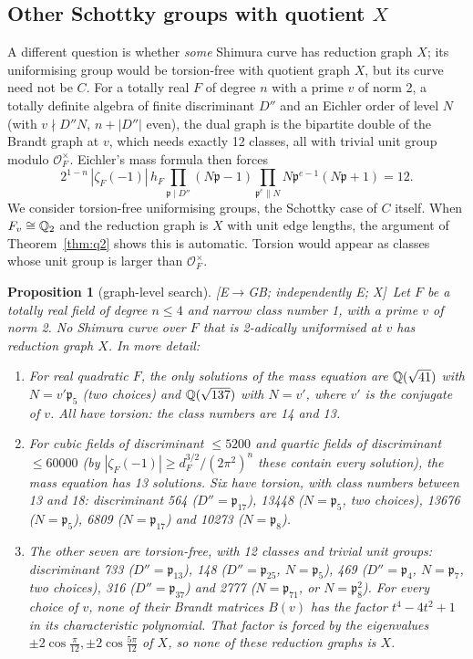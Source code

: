 \documentclass[11pt]{amsart}
\numberwithin{equation}{section}
\theoremstyle{plain}
\newtheorem{proposition}[theorem]{Proposition}
\theoremstyle{definition}\newtheorem{definition}[theorem]{Definition}
\theoremstyle{remark}\newtheorem{remark}[theorem]{Remark}
\newcommand{\ctag}[1]{\textup{\textsf{\scriptsize[#1]}}}
\begin{document}
\subsection{\texorpdfstring{Other Schottky groups with quotient $X$}{Other Schottky groups with quotient X}}\label{sec:graphlevel}
A different question is whether \emph{some} Shimura curve has reduction graph $X$; its uniformising group would be torsion-free with quotient graph $X$, but its curve need not be $C$. For a totally real $F$ of degree $n$ with a prime $v$ of norm 2, a totally definite algebra of finite discriminant $D''$ and an Eichler order of level $N$ (with $v\nmid D''N$, $n+|D''|$ even), the dual graph is the bipartite double of the Brandt graph at $v$, which needs exactly 12 classes, all with trivial unit group modulo $\mathcal O_F^\times$. Eichler's mass formula then forces
\[2^{1-n}\,|\zeta_F(-1)|\,h_F\prod_{\mathfrak p\mid D''}(N\mathfrak p-1)\prod_{\mathfrak p^e\parallel N}N\mathfrak p^{e-1}(N\mathfrak p+1)=12 .\]
We consider torsion-free uniformising groups, the Schottky case of $C$ itself. When $F_v\cong\mathbb{Q}_2$ and the reduction graph is $X$ with unit edge lengths, the argument of Theorem~\ref{thm:q2} shows this is automatic. Torsion would appear as classes whose unit group is larger than $\mathcal O_F^\times$.
\begin{proposition}[graph-level search]\label{prop:mass}
\ctag{E$\to$GB; independently E; X}\ Let $F$ be a totally real field of degree $n\le4$ and narrow class number 1, with a prime $v$ of norm 2. No Shimura curve over $F$ that is 2-adically uniformised at $v$ has reduction graph $X$. In more detail:
\begin{enumerate}[label=(\alph*),nosep]
\item For real quadratic $F$, the only solutions of the mass equation are $\mathbb{Q}(\sqrt{41})$ with $N=v'\mathfrak p_5$ (two choices) and $\mathbb{Q}(\sqrt{137})$ with $N=v'$, where $v'$ is the conjugate of $v$. All have torsion: the class numbers are 14 and 13.
\item For cubic fields of discriminant $\le5200$ and quartic fields of discriminant $\le60000$ (by $|\zeta_F(-1)|\ge d_F^{3/2}/(2\pi^2)^n$ these contain every solution), the mass equation has 13 solutions. Six have torsion, with class numbers between 13 and 18: discriminant 564 ($D''=\mathfrak p_{17}$), 13448 ($N=\mathfrak p_5$, two choices), 13676 ($N=\mathfrak p_5$), 6809 ($N=\mathfrak p_{17}$) and 10273 ($N=\mathfrak p_8$).
\item The other seven are torsion-free, with 12 classes and trivial unit groups: discriminant 733 ($D''=\mathfrak p_{13}$), 148 ($D''=\mathfrak p_{25}$, $N=\mathfrak p_5$), 469 ($D''=\mathfrak p_4$, $N=\mathfrak p_7$, two choices), 316 ($D''=\mathfrak p_{37}$) and 2777 ($N=\mathfrak p_{71}$, or $N=\mathfrak p_8^2$). For every choice of $v$, none of their Brandt matrices $B(v)$ has the factor $t^4-4t^2+1$ in its characteristic polynomial. That factor is forced by the eigenvalues $\pm2\cos\frac\pi{12},\pm2\cos\frac{5\pi}{12}$ of $X$, so none of these reduction graphs is $X$.
\end{enumerate}
\end{proposition}
\end{document}
